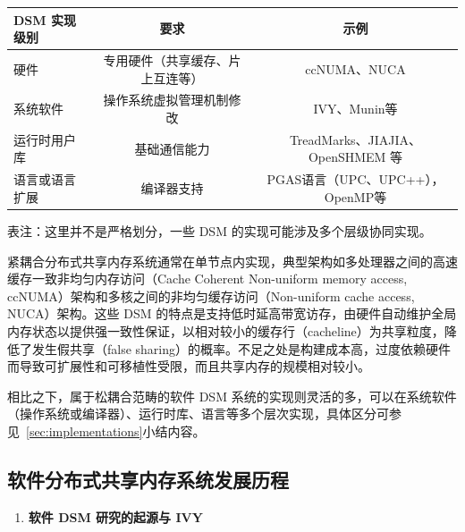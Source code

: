 {  \begin{table}[!htbp]
    \label{tab:dsm-different-implementations}
    \centering
    \footnotesize%
    \setlength{\tabcolsep}{4pt}%
    \renewcommand{\arraystretch}{1.5}%
    \begin{tabular}{lcc}
      \hline
      DSM 实现级别 & 要求               & 示例                            \\
      \hline
      硬件       & 专用硬件（共享缓存、片上互连等） & ccNUMA、NUCA                   \\
      系统软件     & 操作系统虚拟管理机制修改     & IVY、Munin等                    \\
      运行时用户库   & 基础通信能力           & TreadMarks、JIAJIA、OpenSHMEM 等 \\
      语言或语言扩展  & 编译器支持            & PGAS语言（UPC、UPC++），OpenMP等     \\
      \hline
    \end{tabular}

    \vspace*{3ex}

    \begin{minipage}{\textwidth}%
      \mdseries\par\setlength\hangindent{2\ccwd} 表注：这里并不是严格划分，一些 DSM 的实现可能涉及多个层级协同实现。
    \end{minipage}
  \end{table}

  紧耦合分布式共享内存系统通常在单节点内实现，典型架构如多处理器之间的高速缓存一致非均匀内存访问（Cache Coherent Non-uniform memory access, ccNUMA）架构和多核之间的非均匀缓存访问（Non-uniform cache access, NUCA）架构。这些 DSM 的特点是支持低时延高带宽访存，由硬件自动维护全局内存状态以提供强一致性保证，以相对较小的缓存行（cacheline）为共享粒度，降低了发生假共享（false sharing）的概率。不足之处是构建成本高，过度依赖硬件而导致可扩展性和可移植性受限，而且共享内存的规模相对较小。

  相比之下，属于松耦合范畴的软件 DSM 系统的实现则灵活的多，可以在系统软件（操作系统或编译器）、运行时库、语言等多个层次实现，具体区分可参见~\ref{sec:implementations}小结内容。


  \subsection{软件分布式共享内存系统发展历程}
  \begin{enumerate}[leftmargin=1em, align=left]
    \item \textbf{软件 DSM 研究的起源与 IVY}


\end{enumerate}}
